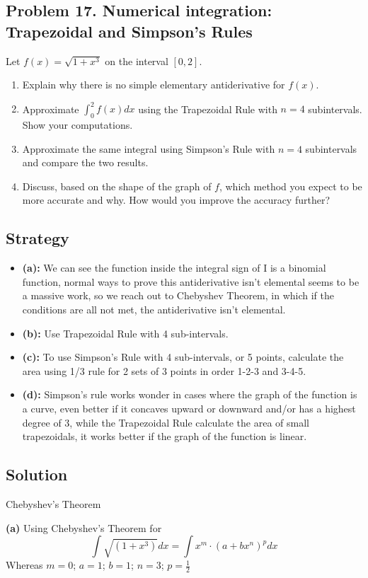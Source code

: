 \subsection{Problem 17. Numerical integration: Trapezoidal and Simpson's Rules}
Let $f(x)=\sqrt{1+x^{3}}$ on the interval $[0, 2]$.
\begin{enumerate}[label=(\alph*)]
    \item Explain why there is no simple elementary antiderivative for $f(x)$.
    \item Approximate $\displaystyle\int_{0}^{2}f(x)dx$ using the Trapezoidal Rule with $n=4$ subintervals. Show your computations.
    \item Approximate the same integral using Simpson's Rule with $n=4$ subintervals and compare the two results.
    \item Discuss, based on the shape of the graph of $f$, which method you expect to be more accurate and why. How would you improve the accuracy further?
\end{enumerate}
\subsection*{Strategy}

\begin{itemize}
    \item \textbf{(a):} We can see the function inside the integral sign of I is a binomial function, normal ways to prove this antiderivative isn't elemental seems to be a massive work, so we reach out to Chebyshev Theorem, in which if the conditions are all not met, the antiderivative isn't elemental.
    \item \textbf{(b):} Use Trapezoidal Rule with 4 sub-intervals.
    \item \textbf{(c):} To use Simpson's Rule with 4 sub-intervals, or 5 points, calculate the area using 1/3 rule for 2 sets of 3 points in order 1-2-3 and 3-4-5.
    \item \textbf{(d):} Simpson's rule works wonder in cases where the graph of the function is a curve, even better if it concaves upward or downward and/or has a highest degree of 3, while the Trapezoidal Rule calculate the area of small trapezoidals, it works better if the graph of the function is linear.
\end{itemize}

\subsection*{Solution}
\begin{theorem}
	Chebyshev's Theorem
\end{theorem}
\textbf{(a)} Using Chebyshev's Theorem for
\[ \int \sqrt{\left(1 + x^3\right)} dx = \int x^m \cdot (a + bx^n)^p dx \]
Whereas $m = 0$; $a = 1$; $b = 1$; $n = 3$; $p = \frac{1}{2}$


